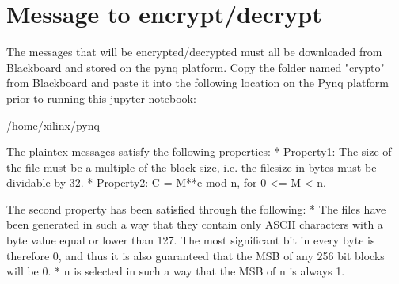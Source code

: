 \documentclass[11pt]{article}
\begin{document}
    \section{Message to encrypt/decrypt}\label{message-to-encryptdecrypt}

The messages that will be encrypted/decrypted must all be downloaded
from Blackboard and stored on the pynq platform. Copy the folder named
"crypto" from Blackboard and paste it into the following location on the
Pynq platform prior to running this jupyter notebook:

/home/xilinx/pynq

The plaintex messages satisfy the following properties: * Property1: The
size of the file must be a multiple of the block size, i.e. the filesize
in bytes must be dividable by 32. * Property2: C = M**e mod n, for 0
\textless{}= M \textless{} n.

The second property has been satisfied through the following: * The
files have been generated in such a way that they contain only ASCII
characters with a byte value equal or lower than 127. The most
significant bit in every byte is therefore 0, and thus it is also
guaranteed that the MSB of any 256 bit blocks will be 0. * n is selected
in such a way that the MSB of n is always 1.
\end{document}

